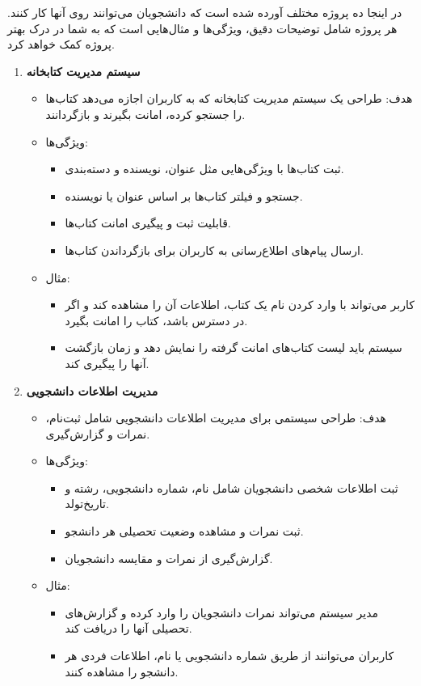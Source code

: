 \documentclass[a4paper,12pt]{article}
\begin{document}
		در اینجا ده پروژه مختلف آورده شده است که دانشجویان می‌توانند روی آنها کار کنند. هر پروژه شامل توضیحات دقیق، ویژگی‌ها و مثال‌هایی است که به شما در درک بهتر پروژه کمک خواهد کرد.
		
		\begin{enumerate}
			
			\item \textbf{سیستم مدیریت کتابخانه}
			\begin{itemize}
				\item هدف: طراحی یک سیستم مدیریت کتابخانه که به کاربران اجازه می‌دهد کتاب‌ها را جستجو کرده، امانت بگیرند و بازگردانند.
				\item ویژگی‌ها:
				\begin{itemize}
					\item ثبت کتاب‌ها با ویژگی‌هایی مثل عنوان، نویسنده و دسته‌بندی.
					\item جستجو و فیلتر کتاب‌ها بر اساس عنوان یا نویسنده.
					\item قابلیت ثبت و پیگیری امانت کتاب‌ها.
					\item ارسال پیام‌های اطلاع‌رسانی به کاربران برای بازگرداندن کتاب‌ها.
				\end{itemize}
				\item مثال:
				\begin{itemize}
					\item کاربر می‌تواند با وارد کردن نام یک کتاب، اطلاعات آن را مشاهده کند و اگر در دسترس باشد، کتاب را امانت بگیرد.
					\item سیستم باید لیست کتاب‌های امانت گرفته را نمایش دهد و زمان بازگشت آنها را پیگیری کند.
				\end{itemize}
			\end{itemize}
			
			\item \textbf{مدیریت اطلاعات دانشجویی}
			\begin{itemize}
				\item هدف: طراحی سیستمی برای مدیریت اطلاعات دانشجویی شامل ثبت‌نام، نمرات و گزارش‌گیری.
				\item ویژگی‌ها:
				\begin{itemize}
					\item ثبت اطلاعات شخصی دانشجویان شامل نام، شماره دانشجویی، رشته و تاریخ‌تولد.
					\item ثبت نمرات و مشاهده وضعیت تحصیلی هر دانشجو.
					\item گزارش‌گیری از نمرات و مقایسه دانشجویان.
				\end{itemize}
				\item مثال:
				\begin{itemize}
					\item مدیر سیستم می‌تواند نمرات دانشجویان را وارد کرده و گزارش‌های تحصیلی آنها را دریافت کند.
					\item کاربران می‌توانند از طریق شماره دانشجویی یا نام، اطلاعات فردی هر دانشجو را مشاهده کنند.
				\end{itemize}
			\end{itemize}
			

\end{enumerate}
\end{document}
